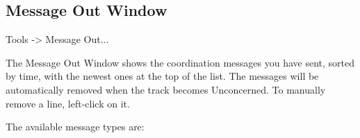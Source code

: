 \documentclass[a4paper,oneside,11pt]{memoir}
\begin{document}
\subsection{Message Out Window}
\label{win:mow}

 Tools -> Message Out...

\bigskip


The Message Out Window shows the coordination messages you have sent, sorted by time, with the newest ones at the top of the list. The messages will be automatically removed when the track becomes Unconcerned. To manually remove a line, left-click on it.

\bigskip

The available message types are:

\bigskip
\end{document}
